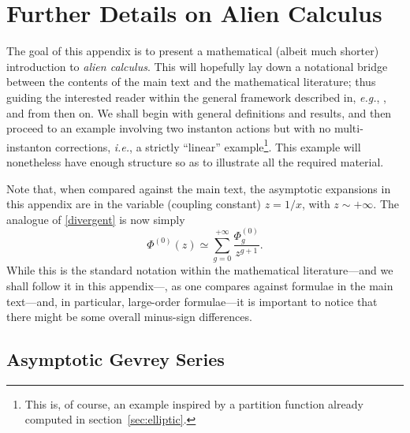 \documentclass[11pt,a4paper]{article}
\newcommand{\be}{\begin{equation}}
\newcommand{\ee}{\end{equation}}
\begin{document}
\newpage


\appendix


\section{Further Details on Alien Calculus}\label{app:alien-calculus}


The goal of this appendix is to present a mathematical (albeit much shorter) introduction to \textit{alien calculus}. This will hopefully lay down a notational bridge between the contents of the main text and the mathematical literature; thus guiding the interested reader within the general framework described in, \textit{e.g.}, \cite{e81, cnp93a, cnp93b, c95, c98, c98b, dp99, ss03, s07, s14, d2014, ms16, lr16, d16, p16}, and from then on. We shall begin with general definitions and results, and then proceed to an example involving two instanton actions but with no multi-instanton corrections, \textit{i.e.}, a strictly ``linear'' example\footnote{This is, of course, an example inspired by a partition function already computed in section~\ref{sec:elliptic}.}. This example will nonetheless have enough structure so as to illustrate all the required material.

Note that, when compared against the main text, the asymptotic expansions in this appendix are in the variable (coupling constant) $z=1/x$, with $z \sim +\infty$. The analogue of \eqref{divergent} is now simply
%
\be
\label{divergent-app}
\Phi^{(0)} (z) \simeq \sum_{g=0}^{+\infty} \frac{\Phi^{(0)}_g}{z^{g+1}}.
\ee
%
\noindent
While this is the standard notation within the mathematical literature---and we shall follow it in this appendix---, as one compares against formulae in the main text---and, in particular, large-order formulae---it is important to notice that there might be some overall minus-sign differences.

\subsection*{Asymptotic Gevrey Series}
\end{document}
